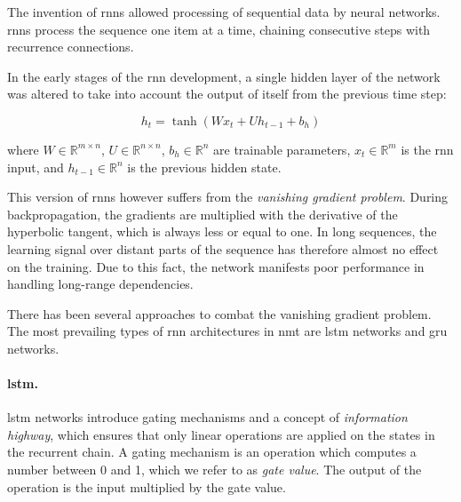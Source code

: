The invention of \acp{rnn} \citep{elman1990finding} allowed processing of
sequential data by neural networks. \Acp{rnn} process the sequence one item at
a time, chaining consecutive steps with recurrence connections.

In the early stages of the \ac{rnn} development, a single hidden layer of the
network was altered to take into account the output of itself from the previous
time step:

%

\begin{equation} h_t = \tanh ( W x_t + U h_{t-1} + b_h ) \label{eq:vanilla-rnn}
\end{equation}

\noindent where $W \in \mathbb{R}^{m \times n}$,
$U \in \mathbb{R}^{n \times n}$, $b_h \in \mathbb{R}^{n}$ are trainable
parameters, $x_t \in \mathbb{R}^{m}$ is the \ac{rnn} input, and
$h_{t-1} \in \mathbb{R}^{n}$ is the previous hidden state.

This version of \acp{rnn} however suffers from the \emph{vanishing gradient
  problem}. During backpropagation, the gradients are multiplied with the
derivative of the hyperbolic tangent, which is always less or equal to one. In
long sequences, the learning signal over distant parts of the sequence has
therefore almost no effect on the training. Due to this fact, the network
manifests poor performance in handling long-range dependencies.

There has been several approaches to combat the vanishing gradient problem.
The most prevailing types of \ac{rnn} architectures in \ac{nmt} are \ac{lstm}
networks and \ac{gru} networks.

\paragraph{\acs{lstm}.} \acl{lstm} networks \citep{hochreiter1997long}
introduce gating mechanisms and a concept of \emph{information highway}, which
ensures that only linear operations are applied on the states in the recurrent
chain. A gating mechanism is an operation which computes a number between 0 and
1, which we refer to as \emph{gate value}.  The output of the operation is the
input multiplied by the gate value.

